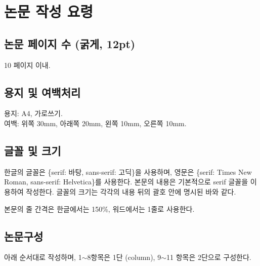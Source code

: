 \documentclass[a4paper,twocolumn]{article}
\begin{document}
\section{논문 작성 요령}
\label{sec:paper_writing_technique}


\subsection{논문 페이지 수 (굵게, 12pt)}
\label{subsec:paper_page_num}

10 페이지 이내.


\subsection{용지 및 여백처리}
\label{subsec:paper_and_margin}

용지: A4, 가로쓰기. \\
여백: 위쪽 30mm, 아래쪽 20mm, 왼쪽 10mm, 오른쪽 10mm.


\subsection{글꼴 및 크기}
\label{subsec:paper_font}

한글의 글꼴은 \{serif: 바탕, sans-serif: 고딕\}을 사용하며, 
영문은 \{serif: Times New Roman, sans-serif: Helvetica\}를 사용한다. 
본문의 내용은 기본적으로 serif 글꼴을 이용하여 작성한다.
글꼴의 크기는 각각의 내용 뒤의 괄호 안에 명시된 바와 같다.

본문의 줄 간격은 한글에서는 150\%, 워드에서는 1줄로 사용한다.


\subsection{논문구성}
\label{subsec:paper_structure}

아래 순서대로 작성하며, 1$\sim$8항목은 1단 (column), 
9$\sim$11 항목은 2단으로 구성한다.
\end{document}
